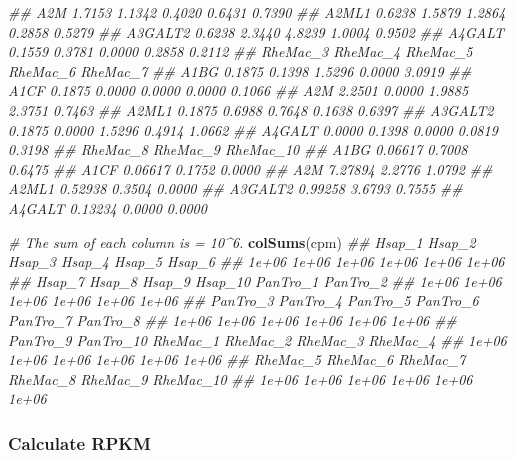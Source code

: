 \documentclass[]{book}
\newenvironment{Shaded}{\begin{snugshade}}{\end{snugshade}}
\newcommand{\CommentTok}[1]{\textcolor[rgb]{0.56,0.35,0.01}{\textit{#1}}}
\newcommand{\KeywordTok}[1]{\textcolor[rgb]{0.13,0.29,0.53}{\textbf{#1}}}
\newcommand{\NormalTok}[1]{#1}
\begin{document}
\begin{Shaded}
\begin{Highlighting}[]
\CommentTok{## A2M       1.7153   1.1342    0.4020   0.6431   0.7390}
\CommentTok{## A2ML1     0.6238   1.5879    1.2864   0.2858   0.5279}
\CommentTok{## A3GALT2   0.6238   2.3440    4.8239   1.0004   0.9502}
\CommentTok{## A4GALT    0.1559   0.3781    0.0000   0.2858   0.2112}
\CommentTok{##         RheMac_3 RheMac_4 RheMac_5 RheMac_6 RheMac_7}
\CommentTok{## A1BG      0.1875   0.1398   1.5296   0.0000   3.0919}
\CommentTok{## A1CF      0.1875   0.0000   0.0000   0.0000   0.1066}
\CommentTok{## A2M       2.2501   0.0000   1.9885   2.3751   0.7463}
\CommentTok{## A2ML1     0.1875   0.6988   0.7648   0.1638   0.6397}
\CommentTok{## A3GALT2   0.1875   0.0000   1.5296   0.4914   1.0662}
\CommentTok{## A4GALT    0.0000   0.1398   0.0000   0.0819   0.3198}
\CommentTok{##         RheMac_8 RheMac_9 RheMac_10}
\CommentTok{## A1BG     0.06617   0.7008    0.6475}
\CommentTok{## A1CF     0.06617   0.1752    0.0000}
\CommentTok{## A2M      7.27894   2.2776    1.0792}
\CommentTok{## A2ML1    0.52938   0.3504    0.0000}
\CommentTok{## A3GALT2  0.99258   3.6793    0.7555}
\CommentTok{## A4GALT   0.13234   0.0000    0.0000}

\CommentTok{# The sum of each column is = 10^6.}
\KeywordTok{colSums}\NormalTok{(cpm)}
\CommentTok{##    Hsap_1    Hsap_2    Hsap_3    Hsap_4    Hsap_5    Hsap_6 }
\CommentTok{##     1e+06     1e+06     1e+06     1e+06     1e+06     1e+06 }
\CommentTok{##    Hsap_7    Hsap_8    Hsap_9   Hsap_10  PanTro_1  PanTro_2 }
\CommentTok{##     1e+06     1e+06     1e+06     1e+06     1e+06     1e+06 }
\CommentTok{##  PanTro_3  PanTro_4  PanTro_5  PanTro_6  PanTro_7  PanTro_8 }
\CommentTok{##     1e+06     1e+06     1e+06     1e+06     1e+06     1e+06 }
\CommentTok{##  PanTro_9 PanTro_10  RheMac_1  RheMac_2  RheMac_3  RheMac_4 }
\CommentTok{##     1e+06     1e+06     1e+06     1e+06     1e+06     1e+06 }
\CommentTok{##  RheMac_5  RheMac_6  RheMac_7  RheMac_8  RheMac_9 RheMac_10 }
\CommentTok{##     1e+06     1e+06     1e+06     1e+06     1e+06     1e+06}
\end{Highlighting}
\end{Shaded}

\hypertarget{calculate-rpkm}{%
\subsubsection{Calculate RPKM}\label{calculate-rpkm}}
\end{document}
